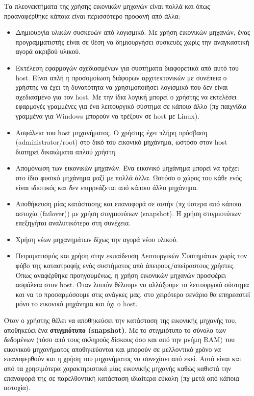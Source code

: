 Τα πλεονεκτήματα της χρήσης εικονικών μηχανών είναι πολλά και όπως προαναφέρθηκε
κάποια είναι περισσότερο προφανή από άλλα:
\begin{itemize}
	\item Δημιουργία υλικών συσκευών από λογισμικό. Με χρήση εικονικών μηχανών,
		ένας προγραμματιστής είναι σε θέση να δημιουργήσει συσκευές χωρίς την
		αναγκαστική αγορά ακριβού υλικού.
	\item Εκτέλεση εφαρμογών σχεδιασμένων για συστήματα διαφορετικά από αυτό
		του host. Είναι απλή η προσομοίωση διάφορων αρχιτεκτονικών με
		συνέπεια ο χρήστης να έχει τη δυνατότητα να χρησιμοποιήσει
		λογισμικό που δεν είναι	σχεδιασμένο για τον host. Με την ίδια
		λογική μπορεί ο χρήστης να εκτελέσει εφαρμογές γραμμένες για ένα
		λειτουργικό σύστημα σε κάποιο άλλο (πχ παιχνίδια γραμμένα για
		Windows μπορούν  να τρέξουν σε host με Linux).
	\item Ασφάλεια του host μηχανήματος. Ο χρήστης έχει πλήρη πρόσβαση
		(administrator/root) στο δικό του εικονικό μηχάνημα, ωστόσο στον host
		διατηρεί δικαιώματα απλού χρήστη.
	\item Απομόνωση των εικονικών μηχανών. Ένα εικονικό μηχάνημα μπορεί να
		τρέχει στο ίδιο φυσικό μηχάνημα μαζί με πολλά άλλα. Ωστόσο ο χώρος του
		κάθε ενός είναι ιδιοτικός και δεν επιρρεάζεται από κάποιο άλλο μηχάνημα.
	\item Αποθήκευση μίας κατάστασης και επαναφορά σε αυτήν (πχ ύστερα από
		κάποια αστοχία (failover)) με χρήση στιγμιοτύπων (snapshot). Η χρήση
		στιγμιοτύπων επεξηγήται αναλυτικότερα στη συνέχεια.
	\item Χρήση νέων μηχανημάτων δίχως την αγορά νέου υλικού.
	\item Πειραματισμός και χρήση στην εκπαίδευση Λειτουργικών Συστημάτων
		χωρίς τον φόβο της καταστροφής ενός συστήματος από
		άπειρους/απείραστους χρήστες. Όπως αναφέρθηκε προηγουμένως, η χρήση
		εικονικών μηχανών προσφέρει ασφάλεια στον host. Όταν λοιπόν θέλουμε να
		αλλάξουμε το λειτουργικό σύστημα και να το προσαρμόσουμε στις ανάγκες
		μας, στο χειρότερο σενάριο θα επηρεαστεί μόνο το εικονικό μηχάνημα και
		όχι ο host.
\end{itemize}

Όταν ο χρήστης θέλει να αποθηκεύσει την κατάσταση της εικονικής μηχανής του,
αποθηκεύει ένα \textbf{στιγμιότυπο (snapshot)}. Με το στιγμιότυπο το σύνολο των
δεδομένων (τόσο από τους σκληρούς δίσκους όσο και από την μνήμη RAM) του
εικονικού μηχανήματος αποθηκεύονται και μπορούν σε μελλοντικό χρόνο να
επαναφερθούν και η χρήση του μηχανήματος να συνεχίσει από εκεί. Αυτό είναι
και από τα χρησιμότερα χαρακτηριστικά μίας εικονικής μηχανής καθώς καθιστά την
επαναφορά της σε παρελθοντική κατάσταση ιδιαίτερα εύκολη (πχ μετά από κάποια
αστοχία).

